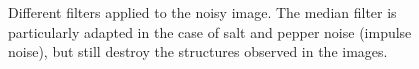\begin{figure}[H]
	\centering\caption{Different filters applied to the noisy image. The median filter is particularly adapted in the case of salt and pepper noise (impulse noise), but still destroy the structures observed in the images.}%
	\hfill
	
	\vspace*{-4pt}
	
	\hfill
	

\end{figure}
